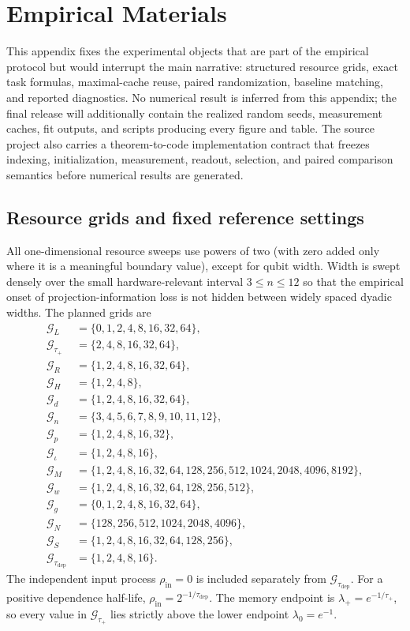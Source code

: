 \section{Empirical Materials}
\label{app:empirical-materials}

This appendix fixes the experimental objects that are part of the empirical
protocol but would interrupt the main narrative: structured resource grids, exact task
formulas, maximal-cache reuse, paired randomization, baseline matching, and
reported diagnostics.  No numerical result is inferred from this appendix;
the final release will additionally contain the realized random seeds,
measurement caches, fit outputs, and scripts producing every figure and table.
The source project also carries a theorem-to-code implementation contract that
freezes indexing, initialization, measurement, readout, selection, and paired
comparison semantics before numerical results are generated.

\subsection{Resource grids and fixed reference settings}
\label{app:dyadic-grids}

All one-dimensional resource sweeps use powers of two (with zero added only where it is a meaningful boundary value), except for qubit width.  Width is swept densely over the small hardware-relevant interval $3\leq n\leq12$ so that the empirical onset of projection-information loss is not hidden between widely spaced dyadic widths.  The planned grids are
\begin{align*}
\mathcal G_L
    &=\{0,1,2,4,8,16,32,64\},\\
\mathcal G_{\tau_+}
    &=\{2,4,8,16,32,64\},\\
\mathcal G_R
    &=\{1,2,4,8,16,32,64\},\\
\mathcal G_H
    &=\{1,2,4,8\},\\
\mathcal G_d
    &=\{1,2,4,8,16,32,64\},\\
\mathcal G_n
    &=\{3,4,5,6,7,8,9,10,11,12\},\\
\mathcal G_p
    &=\{1,2,4,8,16,32\},\\
\mathcal G_\iota
    &=\{1,2,4,8,16\},\\
\mathcal G_M
    &=\{1,2,4,8,16,32,64,128,256,512,1024,2048,4096,8192\},\\
\mathcal G_w
    &=\{1,2,4,8,16,32,64,128,256,512\},\\
\mathcal G_g
    &=\{0,1,2,4,8,16,32,64\},\\
\mathcal G_N
    &=\{128,256,512,1024,2048,4096\},\\
\mathcal G_S
    &=\{1,2,4,8,16,32,64,128,256\},\\
\mathcal G_{\tau_{\mathrm{dep}}}
    &=\{1,2,4,8,16\}.
\end{align*}
The independent input process $\rho_{\mathrm{in}}=0$ is included separately
from $\mathcal G_{\tau_{\mathrm{dep}}}$.  For a positive dependence half-life,
$\rho_{\mathrm{in}}=2^{-1/\tau_{\mathrm{dep}}}$.  The memory endpoint is
$\lambda_+=e^{-1/\tau_+}$, so every value in
$\mathcal G_{\tau_+}$ lies strictly above the lower endpoint
$\lambda_0=e^{-1}$.

